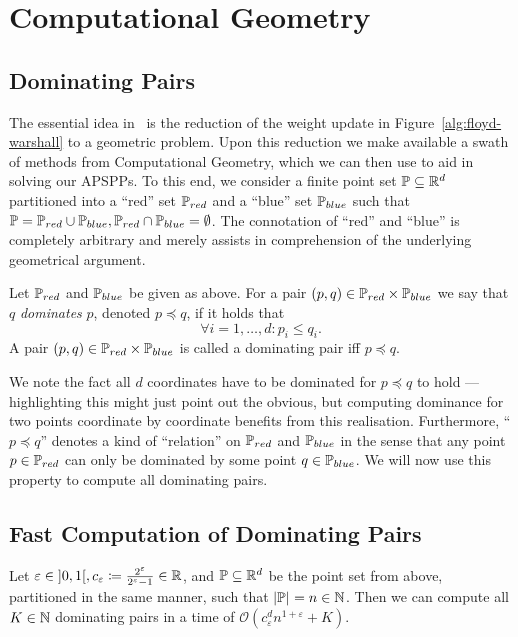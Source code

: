 \chapter{Computational Geometry}

\section{Dominating Pairs}

The essential idea in~\cite{Chan2007} is the reduction of the weight update in Figure~\ref{alg:floyd-warshall} to a geometric problem.
Upon this reduction we make available a swath of methods from Computational Geometry, which we can then use to aid in solving our APSPPs.
To this end, we consider a finite point set $\mathbb{P} \subseteq \mathbb{R}^d$ partitioned into a ``red'' set $\mathbb{P}_{red}$ and a ``blue'' set $\mathbb{P}_{blue}$ such that $\mathbb{P} = \mathbb{P}_{red} \cup \mathbb{P}_{blue}, \mathbb{P}_{red} \cap \mathbb{P}_{blue} = \emptyset$.
The connotation of ``red'' and ``blue'' is completely arbitrary and merely assists in comprehension of the underlying geometrical argument.

\begin{definition}
    Let $\mathbb{P}_{red}$ and $\mathbb{P}_{blue}$ be given as above. For a pair $(p, q) \in \mathbb{P}_{red} \times \mathbb{P}_{blue}$ we say that $q$ \emph{dominates} $p$, denoted $p \preccurlyeq q$, if it holds that
    \[
        \forall i = 1, \dots, d: p_i \leq q_i.
    \]
    A pair $(p, q) \in \mathbb{P}_{red} \times \mathbb{P}_{blue}$ is called a dominating pair iff $p \preccurlyeq q$.
\end{definition}

We note the fact all $d$ coordinates have to be dominated for $p \preccurlyeq q$ to hold --- highlighting this might just point out the obvious, but computing dominance for two points coordinate by coordinate benefits from this realisation.
Furthermore, ``$p \preccurlyeq q$'' denotes a kind of ``relation'' on $\mathbb{P}_{red}$ and $\mathbb{P}_{blue}$ in the sense that any point $p \in \mathbb{P}_{red}$ can only be dominated by some point $q \in \mathbb{P}_{blue}$.
We will now use this property to compute all dominating pairs.

\section{Fast Computation of Dominating Pairs}

\begin{lemma}\label{lem:dominating-pairs}
    Let $\varepsilon \in \interval[open]{0}{1}, c_\varepsilon \coloneqq \frac{2^\varepsilon}{2^\varepsilon - 1} \in \bb{R}$, and $\mathbb{P} \subseteq \mathbb{R}^d$ be the point set from above, partitioned in the same manner, such that $\left\lvert\mathbb{P}\right\rvert_{} = n \in \mathbb{N}$.
    Then we can compute all $K \in \mathbb{N}$ dominating pairs in a time of $\mathcal{O}\left( c_\varepsilon^d n^{1 + \varepsilon} + K \right)$.
\end{lemma}

